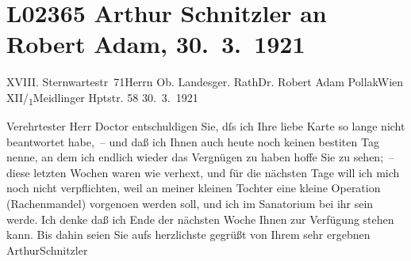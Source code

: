 

\section[Arthur Schnitzler an Robert Adam, 30. 3. 1921]{L02365 Arthur Schnitzler an Robert Adam, 30. 3. 1921}
\nopagebreak{}
\rehead{ }\normalsize\beginnumbering{}
\toendnotes[C]{\smallbreak\pagebreak[2]}
\toendnotes[C]{\smallbreak}\pstart{}{\pb}XVIII. Sternwartestr 71\pend{}{\bigskip}\pstart{}Herrn Ob. Landesger. Rath\pend{}\pstart{}Dr. Robert Adam Pollak\pend{}\pstart{}Wien XII/\textsubscript{1}\pend{}\pstart{}Meidlinger Hptstr. 58\pend{}{\bigskip}\vspace{1em}
\pstart
           \raggedleft{}{\pb}30. 3. 1921\pend
           
\pstart{}Verehrtester Herr Doctor\pend\vspace{0.5em}
\pstart
           entschuldigen Sie, dſs ich Ihre liebe Karte so lange nicht beantwortet habe, – und
               daß ich Ihnen auch heute noch keinen besti{\geminationm}ten Tag
               nenne, an dem ich endlich wieder das Vergnügen zu haben hoffe Sie zu sehen; – diese
               letzten Wochen waren wie verhext, und für die nächsten Tage will ich mich noch nicht
               verpflichten, weil an meiner kleinen Tochter eine kleine Operation (Rachenmandel) vorgeno{\geminationm}en werden soll, und ich im Sanatorium bei ihr sein {\pb}werde. Ich denke daß ich Ende der \introOben{}nächsten\introOben{} Woche Ihnen zur Verfügung stehen kann. Bis dahin seien Sie aufs
               herzlichste gegrüßt von Ihrem sehr ergebnen\pend
           \pstart \spacefill\mbox{ArthurSchnitzler}\pend{}\endnumbering{}  
      
